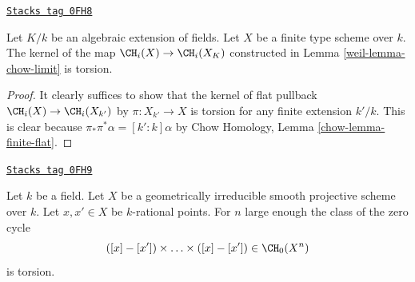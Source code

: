 \begin{lemma}
\label{weil-lemma-kernel-to-closure}
\href{https://stacks.math.columbia.edu/tag/0FH8}{\texttt{Stacks tag 0FH8}}

Let $K/k$ be an algebraic extension of fields.
Let $X$ be a finite type scheme over $k$.
The kernel of the map $\CH_i(X) \to \CH_i(X_K)$
constructed in Lemma \ref{weil-lemma-chow-limit}
is torsion.
\end{lemma}

\begin{proof}
It clearly suffices to show that the kernel
of flat pullback $\CH_i(X) \to \CH_i(X_{k'})$
by $\pi : X_{k'} \to X$ is torsion
for any finite extension $k'/k$. This is clear because
$\pi_* \pi^* \alpha = [k' : k] \alpha$ by
Chow Homology, Lemma \ref{chow-lemma-finite-flat}.
\end{proof}

\begin{lemma}[Voevodsky]

\label{weil-lemma-smash-nilpotence}
\href{https://stacks.math.columbia.edu/tag/0FH9}{\texttt{Stacks tag 0FH9}}

\begin{reference}
\cite{nilpotence}
\end{reference}
Let $k$ be a field. Let $X$ be a geometrically irreducible
smooth projective scheme over $k$. Let $x, x' \in X$ be $k$-rational points.
For $n$ large enough the class of the zero cycle
$$
([x] - [x']) \times \ldots \times ([x] - [x']) \in
\CH_0(X^n)
$$
is torsion.
\end{lemma}

